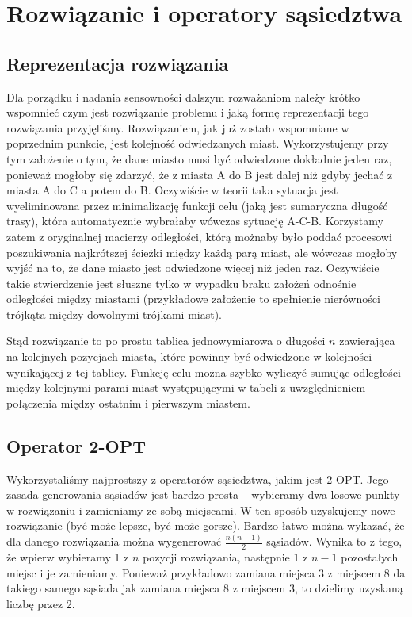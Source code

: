 \section{Rozwiązanie i operatory sąsiedztwa}
\subsection{Reprezentacja rozwiązania}
Dla porządku i nadania sensowności dalszym rozważaniom należy krótko wspomnieć czym jest rozwiązanie problemu i jaką formę reprezentacji tego rozwiązania przyjęliśmy. Rozwiązaniem, jak już zostało wspomniane w poprzednim punkcie, jest kolejność odwiedzanych miast. Wykorzystujemy przy tym założenie o tym, że dane miasto musi być odwiedzone dokładnie jeden raz, ponieważ mogłoby się zdarzyć, że z miasta A do B jest dalej niż gdyby jechać z miasta A do C a potem do B. Oczywiście w teorii taka sytuacja jest wyeliminowana przez minimalizację funkcji celu (jaką jest sumaryczna długość trasy), która automatycznie wybrałaby wówczas sytuację A-C-B. Korzystamy zatem z oryginalnej macierzy odległości, którą możnaby było poddać procesowi poszukiwania najkrótszej ścieżki między każdą parą miast, ale wówczas mogłoby wyjść na to, że dane miasto jest odwiedzone więcej niż jeden raz. Oczywiście takie stwierdzenie jest słuszne tylko w wypadku braku założeń odnośnie odległości między miastami (przykładowe założenie to spełnienie nierówności trójkąta między dowolnymi trójkami miast).

Stąd rozwiązanie to po prostu tablica jednowymiarowa o długości $n$ zawierająca na kolejnych pozycjach miasta, które powinny być odwiedzone w kolejności wynikającej z tej tablicy. Funkcję celu można szybko wyliczyć sumując odległości między kolejnymi parami miast występującymi w tabeli z uwzględnieniem połączenia między ostatnim i pierwszym miastem.

\subsection{Operator 2-OPT}

Wykorzystaliśmy najprostszy z operatorów sąsiedztwa, jakim jest 2-OPT. Jego zasada generowania sąsiadów jest bardzo prosta -- wybieramy dwa losowe punkty w rozwiązaniu i zamieniamy ze sobą miejscami. W ten sposób uzyskujemy nowe rozwiązanie (być może lepsze, być może gorsze). Bardzo łatwo można wykazać, że dla danego rozwiązania można wygenerować $\frac{n(n-1)}{2}$ sąsiadów. Wynika to z tego, że wpierw wybieramy 1 z $n$ pozycji rozwiązania, następnie 1 z $n-1$ pozostałych miejsc i je zamieniamy. Ponieważ przykładowo zamiana miejsca 3 z miejscem 8 da takiego samego sąsiada jak zamiana miejsca 8 z miejscem 3, to dzielimy uzyskaną liczbę przez 2.